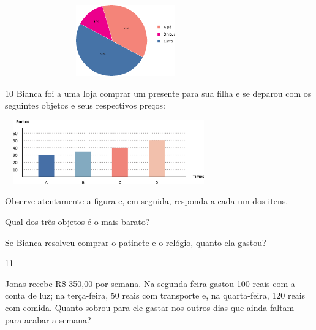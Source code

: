 {\begin{escolha}
\item
\includegraphics[width=4.10036in,height=1.20844in]{media/image78.png}
\end{escolha}


\num{10} Bianca foi a uma loja comprar um presente para sua filha e se deparou
com os seguintes objetos e seus respectivos preços:


\includegraphics[width=3.51697in,height=1.08343in]{media/image80.png}

Observe atentamente a figura e, em seguida, responda a cada um dos itens.

\begin{escolha}

\item
  Qual dos três objetos é o mais barato?

\item
  Se Bianca resolveu comprar o patinete e o relógio, quanto ela gastou?

\num{11}

Jonas recebe R\$ 350,00 por semana. Na segunda-feira gastou 100 reais
com a conta de luz; na terça-feira, 50 reais com transporte e, na quarta-feira, 120 reais com comida. Quanto sobrou para ele gastar nos outros
dias que ainda faltam para acabar a semana?


\end{escolha}}
